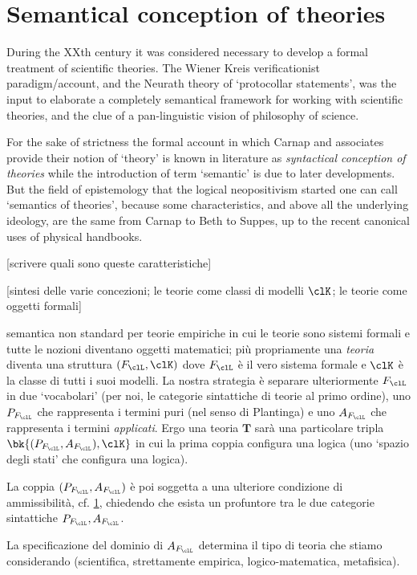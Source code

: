 \section{Semantical conception of theories}
During the XXth century it was considered necessary to develop a formal treatment of scientific theories. The Wiener Kreis verificationist paradigm/account, and the Neurath theory of `protocollar statements', was the input to elaborate a completely semantical framework for working with scientific theories, and the clue of a pan-linguistic vision of philosophy of science. 

For the sake of strictness the formal account in which Carnap and associates provide their notion of `theory' is known in literature as \emph{syntactical conception of theories} \cite{.} while the introduction of term `semantic' is due to later developments. But the field of epistemology that the logical neopositivism started one can call `semantics of theories', because some characteristics, and above all the underlying ideology, are the same from Carnap to Beth to Suppes, up to the recent canonical uses of physical handbooks. 

[scrivere quali sono queste caratteristiche]

[sintesi delle varie concezioni; le teorie come classi di modelli $\clK$; 
le teorie come oggetti formali]

semantica non standard per teorie empiriche in cui le teorie sono sistemi formali e tutte le nozioni diventano oggetti matematici; più propriamente una \emph{teoria} diventa una struttura $(F_\clL, \clK)$ dove $F_\clL$ è il vero sistema formale e $\clK$ è la classe di tutti i suoi modelli. La nostra strategia è separare ulteriormente $F_\clL$ in due `vocabolari' (per noi, le categorie sintattiche di teorie al primo ordine), uno $P_{F_\clL}$ che rappresenta i termini puri (nel senso di Plantinga) e uno $A_{F_\clL}$ che rappresenta i termini \emph{applicati}. Ergo una teoria $\mathbf{T}$ sarà una particolare tripla $\bk{(P_{F_\clL},A_{F_\clL}), \clK}$ in cui la prima coppia configura una logica (uno `spazio degli stati' che configura una logica). 

La coppia $(P_{F_\clL},A_{F_\clL})$ è poi soggetta a una ulteriore condizione di ammissibilità, cf. \ref{}, chiedendo che esista un profuntore tra le due categorie sintattiche $P_{F_\clL},A_{F_\clL}$.

La specificazione del dominio di $A_{F_\clL}$ determina il tipo di teoria che stiamo considerando (scientifica, strettamente empirica, logico-matematica, metafisica).

